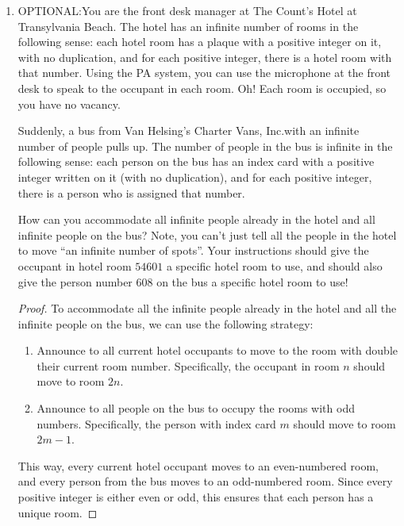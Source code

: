\documentclass{article}
\begin{document}
\begin{enumerate}
\newpage

\item OPTIONAL:\@ You are the front desk manager at The Count's Hotel at Transylvania Beach. The hotel has an infinite number of rooms in the following sense: each hotel room has a plaque with a positive integer on it, with no duplication, and for each positive integer, there is a hotel room with that number. Using the PA system, you can use the microphone at the front desk to speak to the occupant in each room. Oh! Each room is occupied, so you have no vacancy. 

Suddenly, a bus from Van Helsing's Charter Vans, Inc.\@ with an infinite number of people pulls up. The number of people in the bus is infinite in the following sense: each person on the bus has an index card with a positive integer written on it (with no duplication), and for each positive integer, there is a person who is assigned that number.

How can you accommodate all infinite people already in the hotel and all infinite people on the bus? Note, you can't just tell all the people in the hotel to move ``an infinite number of spots''. Your instructions should give the occupant in hotel room $54601$ a specific hotel room to use, and should also give the person number $608$ on the bus a specific hotel room to use!

\begin{proof}
    To accommodate all the infinite people already in the hotel and all the infinite people on the bus, we can use the following strategy:
    \begin{enumerate}[label=\arabic*.]
    \item Announce to all current hotel occupants to move to the room with double their current room number. Specifically, the occupant in room $n$ should move to room $2n$.
    \item Announce to all people on the bus to occupy the rooms with odd numbers. Specifically, the person with index card $m$ should move to room $2m-1$.
    \end{enumerate}
    This way, every current hotel occupant moves to an even-numbered room, and every person from the bus moves to an odd-numbered room. Since every positive integer is either even or odd, this ensures that each person has a unique room.


\end{proof}
\end{enumerate}
\end{document}
